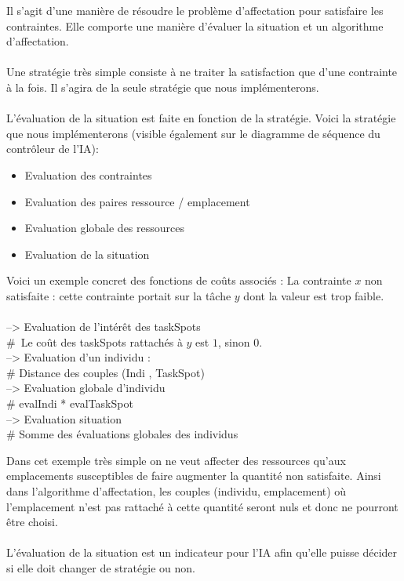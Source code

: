 Il s'agit d'une manière de résoudre le problème d'affectation pour satisfaire les contraintes. Elle comporte une manière d'évaluer la situation et un algorithme d'affectation.\\\\

Une stratégie très simple consiste à ne traiter la satisfaction que d'une contrainte à la fois. Il s'agira de la seule stratégie que nous implémenterons.\\\\

L'évaluation de la situation est faite en fonction de la stratégie. Voici la stratégie que nous implémenterons (visible également sur le diagramme de séquence du contrôleur de l'IA):
\begin{itemize}
\item Evaluation des contraintes
\item Evaluation des paires ressource / emplacement
\item Evaluation globale des ressources
\item Evaluation de la situation
\end{itemize}

Voici un exemple concret des fonctions de coûts associés :
La contrainte $x$ non satisfaite : cette contrainte portait sur la tâche $y$ dont la valeur est trop faible.\\

\\--> Evaluation de l'intérêt des taskSpots
\\# Le coût des taskSpots rattachés à $y$ est $1$, sinon $0$.
\\--> Evaluation d'un individu :
\\# Distance des couples (Indi , TaskSpot)
\\--> Evaluation globale d'individu
\\# evalIndi * evalTaskSpot
\\--> Evaluation situation
\\# Somme des évaluations globales des individus

Dans cet exemple très simple on ne veut affecter des ressources qu'aux emplacements susceptibles de faire augmenter la quantité non satisfaite. Ainsi dans l'algorithme d'affectation, les couples (individu, emplacement) où l'emplacement n'est pas rattaché à cette quantité seront nuls et donc ne pourront être choisi.\\\\
L'évaluation de la situation est un indicateur pour l'IA afin qu'elle puisse décider si elle doit changer de stratégie ou non.


